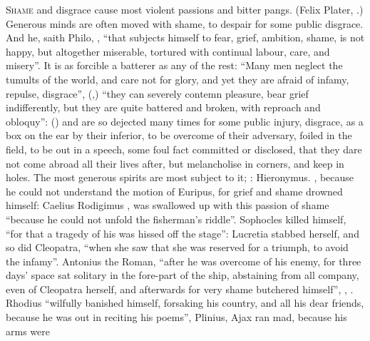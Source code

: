\lettrine{S}{hame} and disgrace cause most violent passions and bitter pangs.
 (Felix Plater, .) Generous minds are often moved with shame, to despair for some
public disgrace. And he, saith Philo, , \enquote{that subjects himself to fear, grief, ambition,
shame, is not happy, but altogether miserable, tortured with continual labour,
care, and misery}. It is as forcible a batterer as any of the rest:
\enquote{Many men neglect the tumults of the world, and care not
for glory, and yet they are afraid of infamy, repulse, disgrace},
(,) \enquote{they can severely contemn pleasure,
bear grief indifferently, but they are quite battered and
broken, with reproach and obloquy}: () and are so dejected many times for some public injury, disgrace, as
a box on the ear by their inferior, to be overcome of their adversary, foiled
in the field, to be out in a speech, some foul fact committed or disclosed,
\etc{} that they dare not come abroad all their lives after, but melancholise
in corners, and keep in holes. The most generous spirits are most subject to
it; : Hieronymus. \Aristotle{}, because he
could not understand the motion of Euripus, for grief and shame drowned
himself: Caelius Rodigimus  , was swallowed up with this passion of
shame \enquote{because he could not unfold the fisherman's
riddle}. Sophocles killed himself, \enquote{for that a tragedy of
his was hissed off the stage}:  Lucretia stabbed herself, and so did Cleopatra,
\enquote{when she saw that she was reserved for a triumph, to avoid the infamy}.
Antonius the Roman, \enquote{after he was overcome of his enemy,
for three days' space sat solitary in the fore-part of the ship, abstaining
from all company, even of Cleopatra herself, and afterwards for very shame
butchered himself}, \Plutarch{}, . \Apollonius{}
Rhodius \enquote{wilfully banished himself, forsaking his country,
and all his dear friends, because he was out in reciting his poems}, Plinius,
 Ajax ran mad, because his arms were
